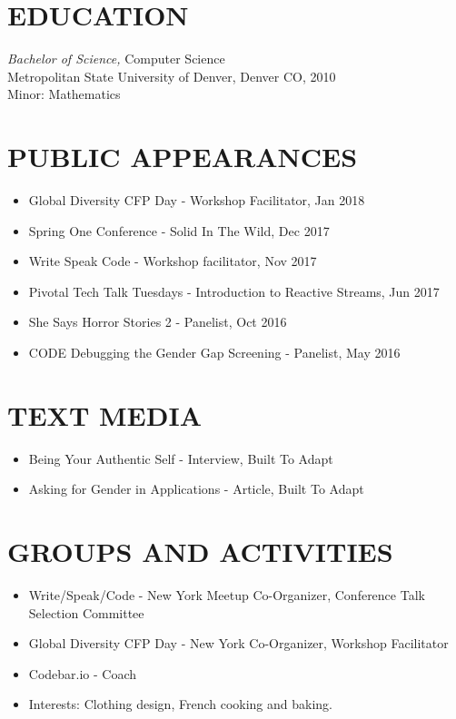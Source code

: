 \documentclass[line,margin]{res}
\begin{document}
\begin{resume}
\section{EDUCATION} {\sl Bachelor of Science,} Computer Science
\\
Metropolitan State University of Denver, Denver CO, 2010 \\               Minor: Mathematics

\section{PUBLIC APPEARANCES}
\begin{itemize}
\item Global Diversity CFP Day - Workshop Facilitator, Jan 2018
\item Spring One Conference - Solid In The Wild, Dec 2017
\item Write Speak Code - Workshop facilitator, Nov 2017
\item Pivotal Tech Talk Tuesdays - Introduction to Reactive Streams, Jun 2017
\item She Says Horror Stories 2 - Panelist, Oct 2016
\item CODE Debugging the Gender Gap Screening - Panelist, May 2016
\end{itemize}

\section{TEXT MEDIA}
\begin{itemize}
\item Being Your Authentic Self - Interview, Built To Adapt
\item Asking for Gender in Applications - Article, Built To Adapt
\end{itemize}

\section{GROUPS AND ACTIVITIES}        
\begin{itemize}   %
\item Write/Speak/Code - New York Meetup Co-Organizer, Conference Talk Selection Committee
\item Global Diversity CFP Day - New York Co-Organizer, Workshop Facilitator
\item Codebar.io - Coach
\item Interests: Clothing design, French cooking and baking.
\end{itemize}
 

\end{resume}
\end{document}
